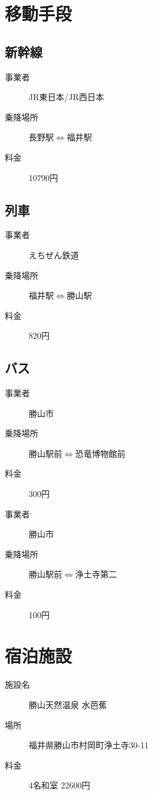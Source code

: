 \documentclass[platex,dvipdfmx]{jlreq}			%
\begin{document}
\begin{center}
  \huge {}
\end{center}
\rightline{\today}
\section{移動手段}
\subsection{新幹線}
\begin{description}
  \item[事業者]JR東日本/JR西日本
  \item[乗降場所]長野駅$\Leftrightarrow$福井駅
  \item[料金]10790円
\end{description}
\subsection{列車}
\begin{description}
  \item[事業者]えちぜん鉄道
  \item[乗降場所]福井駅$\Leftrightarrow$勝山駅  
  \item[料金] 820円 
\end{description}
\subsection{バス}
\begin{description}
  \item[事業者]勝山市
  \item[乗降場所]勝山駅前$\Leftrightarrow$恐竜博物館前
  \item[料金] 300円
\end{description}
\begin{description}
  \item[事業者]勝山市 
  \item[乗降場所]勝山駅前$\Leftrightarrow$浄土寺第二
  \item[料金] 100円 
\end{description}


\section{宿泊施設}
\begin{description}
  \item[施設名] 勝山天然温泉 水芭蕉
  \item[場所] 福井県勝山市村岡町浄土寺30-11
  \item[料金] 4名和室 22600円
\end{description}
\end{document}

